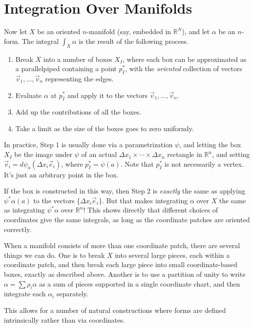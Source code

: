 \documentclass[12pt]{amsbook}
\newcommand{\R}{{\mathbb R}}
\theoremstyle{definition}
\begin{document}
\section{Integration Over Manifolds}

Now let $X$ be an oriented $n$-manifold (say, embedded in $\R^N$), 
and let $\alpha$ be an $n$-form. 
The integral $\int_X \alpha$ is the result of the following process. 

\begin{enumerate}
\item Break $X$ into a number of boxes $X_I$, 
where each box can be approximated as a parallelpiped containing a point 
$p_I^*$,
with the {\em oriented} collection of vectors 
$\vec v_1, \ldots, \vec v_n$ representing the edges. 
\item Evaluate $\alpha$ at $p_I^*$ and apply it to the vectors 
$\vec v_1, \ldots, \vec v_n$. 
\item Add up the contributions of all the boxes. 
\item Take a limit as the size of the boxes goes to zero uniformly. 
\end{enumerate}

In practice, Step 1 
is usually done via a parametrization $\psi$, and letting the box $X_I$ be
the image under $\psi$ of an actual $\Delta x_1 \times \cdots \times
\Delta x_n$ rectangle in $\R^n$, and setting
$\vec v_i=d\psi_a(\Delta x_i \vec e_i)$, where $p_I^*=\psi(a)$. Note that 
$p_I^*$ is not necessarily a vertex. It's just an arbitrary point in the
box. 

If the box is constructed in this way, then 
Step 2 is {\em exactly} the same as applying $\psi^*\alpha(a)$ to the vectors 
$\{\Delta x_i \vec e_i\}$. But that makes integrating $\alpha$ over $X$ 
the same as integrating 
$\psi^*\alpha$ over $\R^n$! This shows directly that different choices of 
coordinates give the same integrals, as long as the coordinate patches are 
oriented correctly. 

When a manifold consists of more than one coordinate patch, there are several
things we can do. One is to break $X$ into several large pieces, each within
a coordinate patch, and then break each large piece into small 
coordinate-based boxes, exactly as described above. 
Another is to use a partition of unity to write 
$\alpha = \sum \rho_i \alpha$ as a sum of pieces supported in a 
single coordinate chart, and then integrate each $\alpha_i$ separately. 

This allows for a number of natural constructions where forms are defined
intrinsically rather than via coordinates.
\end{document}
